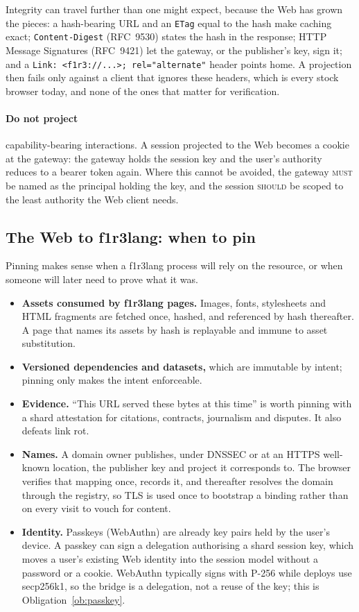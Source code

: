 \documentclass[11pt]{article}
\theoremstyle{definition}
\theoremstyle{remark}
\newcommand{\fl}{f1r3lang}
\newcommand{\MUST}{\textsc{must}}
\newcommand{\SHOULD}{\textsc{should}}
\newcommand{\code}[1]{\texttt{#1}}
\begin{document}
\noindent
Integrity can travel further than one might expect, because the Web has grown the
pieces: a hash-bearing URL and an \code{ETag} equal to the hash make caching exact;
\code{Content-Digest} (RFC~9530) states the hash in the response; HTTP Message
Signatures (RFC~9421) let the gateway, or the publisher's key, sign it; and a
\code{Link:~<f1r3://...>;~rel="alternate"} header points home. A projection then fails
only against a client that ignores these headers, which is every stock browser today,
and none of the ones that matter for verification.

\paragraph{Do not project} capability-bearing interactions. A session projected to the
Web becomes a cookie at the gateway: the gateway holds the session key and the user's
authority reduces to a bearer token again. Where this cannot be avoided, the gateway
\MUST{} be named as the principal holding the key, and the session \SHOULD{} be scoped
to the least authority the Web client needs.

\subsection{The Web to \fl{}: when to pin}

Pinning makes sense when a \fl{} process will rely on the resource, or when someone
will later need to prove what it was.

\begin{itemize}[nosep]
\item \textbf{Assets consumed by \fl{} pages.} Images, fonts, stylesheets and HTML
  fragments are fetched once, hashed, and referenced by hash thereafter. A page that
  names its assets by hash is replayable and immune to asset substitution.
\item \textbf{Versioned dependencies and datasets,} which are immutable by intent;
  pinning only makes the intent enforceable.
\item \textbf{Evidence.} ``This URL served these bytes at this time'' is worth pinning
  with a shard attestation for citations, contracts, journalism and disputes. It also
  defeats link rot.
\item \textbf{Names.} A domain owner publishes, under DNSSEC or at an HTTPS
  well-known location, the publisher key and project it corresponds to. The browser
  verifies that mapping once, records it, and thereafter resolves the domain through
  the registry, so TLS is used once to bootstrap a binding rather than on every
  visit to vouch for content.
\item \textbf{Identity.} Passkeys (WebAuthn) are already key pairs held by the user's
  device. A passkey can sign a delegation authorising a shard session key, which moves a
  user's existing Web identity into the session model without a password or a cookie.
  WebAuthn typically signs with P-256 while deploys use secp256k1, so the bridge is a
  delegation, not a reuse of the key; this is Obligation~\ref{ob:passkey}.
\end{itemize}
\end{document}
